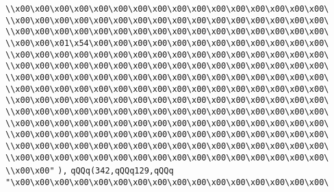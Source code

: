 \verb|\\x00\x00\x00\x00\x00\x00\x00\x00\x00\x00\x00\x00\x00\x00\x00\x00\|\newline
\verb|\\x00\x00\x00\x00\x00\x00\x00\x00\x00\x00\x00\x00\x00\x00\x00\x00\|\newline
\verb|\\x00\x00\x00\x00\x00\x00\x00\x00\x00\x00\x00\x00\x00\x00\x00\x00\|\newline
\verb|\\x00\x00\x01\x54\x00\x00\x00\x00\x00\x00\x00\x00\x00\x00\x00\x00\|\newline
\verb|\\x00\x00\x00\x00\x00\x00\x00\x00\x00\x00\x00\x00\x00\x00\x00\x00\|\newline
\verb|\\x00\x00\x00\x00\x00\x00\x00\x00\x00\x00\x00\x00\x00\x00\x00\x00\|\newline
\verb|\\x00\x00\x00\x00\x00\x00\x00\x00\x00\x00\x00\x00\x00\x00\x00\x00\|\newline
\verb|\\x00\x00\x00\x00\x00\x00\x00\x00\x00\x00\x00\x00\x00\x00\x00\x00\|\newline
\verb|\\x00\x00\x00\x00\x00\x00\x00\x00\x00\x00\x00\x00\x00\x00\x00\x00\|\newline
\verb|\\x00\x00\x00\x00\x00\x00\x00\x00\x00\x00\x00\x00\x00\x00\x00\x00\|\newline
\verb|\\x00\x00\x00\x00\x00\x00\x00\x00\x00\x00\x00\x00\x00\x00\x00\x00\|\newline
\verb|\\x00\x00\x00\x00\x00\x00\x00\x00\x00\x00\x00\x00\x00\x00\x00\x00\|\newline
\verb|\\x00\x00\x00\x00\x00\x00\x00\x00\x00\x00\x00\x00\x00\x00\x00\x00\|\newline
\verb|\\x00\x00\x00\x00\x00\x00\x00\x00\x00\x00\x00\x00\x00\x00\x00\x00\|\newline
\verb|\\x00\x00"|\newline
\verb|),|\newline
\verb|qQQq(342,qQQq129,qQQq|\newline
\verb|"\x00\x00\x00\x00\x00\x00\x00\x00\x00\x00\x00\x00\x00\x00\x00\x00\|\newline
